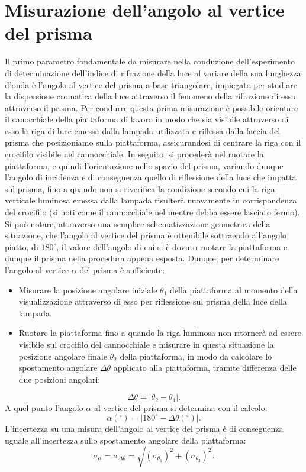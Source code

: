 \documentclass[a4paper,12pt]{article}
\begin{document}
\section{Misurazione dell’angolo al vertice del prisma}
\label{sec:angolo al vertice}
Il primo parametro fondamentale da misurare nella conduzione dell’esperimento di determinazione dell’indice di rifrazione della luce al variare della sua lunghezza d’onda è l’angolo al vertice del prisma a base triangolare, impiegato per studiare la dispersione cromatica della luce attraverso il fenomeno della rifrazione di essa attraverso il prisma. Per condurre questa prima misurazione è possibile orientare il canocchiale della piattaforma di lavoro in modo che sia visibile attraverso di esso la riga di luce emessa dalla lampada utilizzata e riflessa dalla faccia del prisma che posizioniamo sulla piattaforma, assicurandosi di centrare la riga con il crocifilo visibile nel cannocchiale. In seguito, si procederà nel ruotare la piattaforma, e quindi l’orientazione nello spazio del prisma, variando dunque l’angolo di incidenza e di conseguenza quello di riflessione della luce che impatta sul prisma, fino a quando non si riverifica la condizione secondo cui la riga verticale luminosa emessa dalla lampada risulterà nuovamente in corrispondenza del crocifilo (si noti come il cannocchiale nel mentre debba essere lasciato fermo). Si può notare, attraverso una semplice schematizzazione geometrica della situazione, che l’angolo al vertice del prisma è ottenibile sottraendo all’angolo piatto, di \( 180^\circ \), il valore dell’angolo di cui si è dovuto ruotare la piattaforma e dunque il prisma nella procedura appena esposta. Dunque, per determinare l’angolo al vertice \( \alpha \) del prisma è sufficiente:
\begin{itemize}
    \item Misurare la posizione angolare iniziale \( \theta_1 \) della piattaforma al momento della visualizzazione attraverso di esso per riflessione sul prisma della luce della lampada.
    \item Ruotare la piattaforma fino a quando la riga luminosa non ritornerà ad essere visibile sul crocifilo del cannocchiale e misurare in questa situazione la posizione angolare finale \( \theta_2 \) della piattaforma, in modo da calcolare lo spostamento angolare \( \Delta\theta \) applicato alla piattaforma, tramite differenza delle due posizioni angolari:
\end{itemize}
\[
\Delta\theta = |\theta_2 - \theta_1|.
\]
A quel punto l’angolo \( \alpha \) al vertice del prisma si determina con il calcolo:
\[
\alpha(^\circ) = |180^\circ - \Delta\theta(^\circ)|.
\]
L’incertezza su una misura dell’angolo al vertice del prisma è di conseguenza uguale all’incertezza sullo spostamento angolare della piattaforma:
\[
\sigma_\alpha = \sigma_{\Delta\theta} = \sqrt{(\sigma_{\theta_1})^2 + (\sigma_{\theta_2})^2}.
\]
\end{document}

